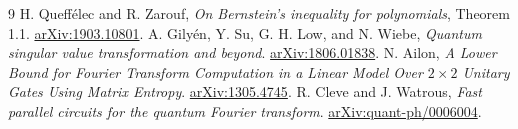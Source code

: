 \documentclass[11pt]{article}
\theoremstyle{definition}
\begin{document}
\begin{thebibliography}{9}
 H. Queff\'elec and R. Zarouf,
\emph{On Bernstein's inequality for polynomials}, Theorem 1.1.
\href{https://arxiv.org/abs/1903.10801}{arXiv:1903.10801}.
 A. Gily\'en, Y. Su, G. H. Low, and N. Wiebe,
\emph{Quantum singular value transformation and beyond}.
\href{https://arxiv.org/abs/1806.01838}{arXiv:1806.01838}.
 N. Ailon,
\emph{A Lower Bound for Fourier Transform Computation in a Linear Model
Over $2\times2$ Unitary Gates Using Matrix Entropy}.
\href{https://arxiv.org/abs/1305.4745}{arXiv:1305.4745}.
 R. Cleve and J. Watrous,
\emph{Fast parallel circuits for the quantum Fourier transform}.
\href{https://arxiv.org/abs/quant-ph/0006004}{arXiv:quant-ph/0006004}.
\end{thebibliography}
\end{document}
